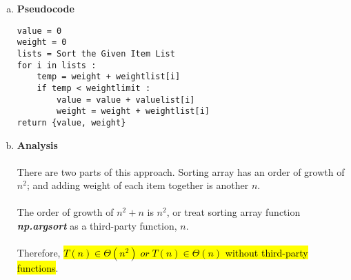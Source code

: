\documentclass[11pt]{article}
\begin{document}
\begin{enumerate}
\begin{enumerate}[(a)]
		\item
		\textbf{Pseudocode}

		\lstset{basicstyle=\footnotesize}
		\begin{lstlisting}[xleftmargin=\dimexpr-\leftmarginii-\leftmargini]
value = 0
weight = 0
lists = Sort the Given Item List
for i in lists :
	temp = weight + weightlist[i]
	if temp < weightlimit :
		value = value + valuelist[i]
		weight = weight + weightlist[i]
return {value, weight}
		\end{lstlisting}

		\item
		\textbf{Analysis} \\\\
		There are two parts of this approach. Sorting array has an order of growth of $n^2$;
		 and adding weight of each item together is another $n$. \\\\
		The order of growth of $n^2 + n$ is $n^2$, or treat sorting array function
		 \textbf{\textit{np.argsort}} as a third-party function, $n$. \\\\
		Therefore, \hl{$T(n) \in \Theta (n^2) \; or \; T(n) \in \Theta (n)$ without third-party functions}. \\\\
	\end{enumerate}


\end{enumerate}
\end{document}
